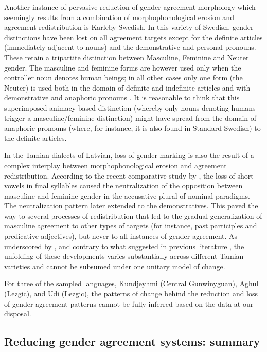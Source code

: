 \documentclass[output=collectionpaper]{langsci/langscibook}
\begin{document}
Another instance of pervasive reduction of gender agreement morphology which seemingly results from a combination of morphophonological erosion and agreement redistribution is Karleby Swedish. In this variety of Swedish, gender distinctions have been lost on all agreement targets except for the definite articles (immediately adjacent to nouns) and the demonstrative and personal pronouns. These retain a tripartite distinction between Masculine, Feminine and Neuter gender. The masculine and feminine forms are however used only when the controller noun denotes human beings; in all other cases only one form (the Neuter) is used both in the domain of definite and indefinite articles and with demonstrative and anaphoric pronouns \citep{Hulden1972,Hultman1894}. It is reasonable to think that this superimposed animacy-based distinction (whereby only nouns denoting humans trigger a masculine/feminine distinction) might have spread from the domain of anaphoric pronouns (where, for instance, it is also found in Standard Swedish) to the definite articles.



In the Tamian dialects of Latvian, loss of gender marking is also the result of a complex interplay between morphophonological erosion and agreement redistribution. According to the recent comparative study by \citet{Waelchli2017}, the loss of short vowels in final syllables caused the neutralization of the opposition between masculine and feminine gender in the accusative plural of
nominal paradigms. The neutralization pattern later extended to the demonstratives. This paved the way to several processes of redistribution that led to the gradual generalization of masculine agreement to other types of targets (for instance, past participles and predicative adjectives), but never to all instances of gender agreement. As underscored by \citet{Waelchli2017}, and contrary to what suggested in previous literature \citep{Rudzite1980}, the unfolding of these developments varies substantially across different Tamian varieties and cannot be subsumed under one unitary model of change.



For three of the sampled languages, Kundjeyhmi (Central Gunwinyguan), Aghul (Lezgic), and Udi (Lezgic), the patterns of change behind the reduction and loss of gender agreement patterns cannot be fully inferred based on the data at our disposal.



\subsection{Reducing gender agreement systems: summary}
\end{document}
